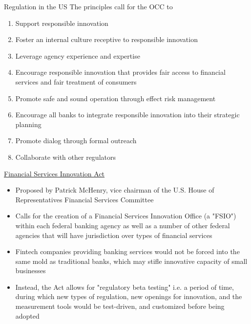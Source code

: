 \documentclass[11pt]{beamer}
\begin{document}
\begin{frame}{Regulation in the US}
	The principles call for the OCC to
	\begin{enumerate}
		\item Support responsible innovation
		\item Foster an internal culture receptive to responsible innovation
		\item Leverage agency experience and expertise
		\item Encourage responsible innovation that provides fair access to financial services and fair treatment of consumers
		\item Promote safe and sound operation through effect risk management
		\item Encourage all banks to integrate responsible innovation into their strategic planning
		\item Promote dialog through formal outreach
		\item Collaborate with other regulators
	\end{enumerate}
\end{frame}



\begin{frame}{\href{https://www.congress.gov/bill/114th-congress/house-bill/6118/text}{Financial Services Innovation Act}}
	\begin{itemize}
		\item Proposed by Patrick McHenry, vice chairman of the U.S. House of Representatives Financial Services Committee
		\item Calls for the creation of a Financial Services Innovation Office (a "FSIO") within each federal banking agency as well as a number of other federal agencies that will have jurisdiction over types of financial services
		\item Fintech companies providing banking services would not be forced into the same mold as traditional banks, which may stifle innovative capacity of small businesses
		\item Instead, the Act allows for "regulatory beta testing" i.e. a period of time, during which new types of regulation, new openings for innovation, and the measurement tools would be test-driven, and customized before being adopted
	\end{itemize}
\end{frame}
\end{document}
